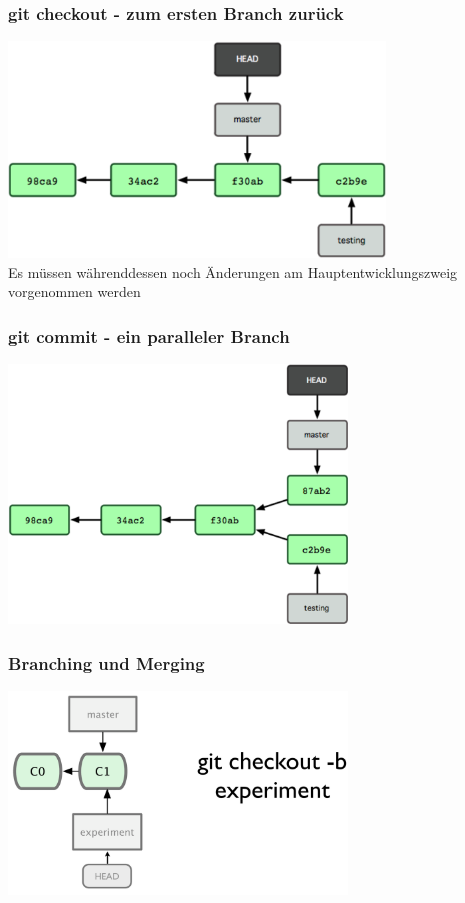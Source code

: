 \begin{frame}
  \frametitle{git checkout - zum ersten Branch zurück}
  \begin{center}
    \includegraphics[width=10cm]{img/checkout.png} \\
    Es müssen währenddessen noch Änderungen am Hauptentwicklungszweig vorgenommen werden
  \end{center}
\end{frame}

\begin{frame}
  \frametitle{git commit - ein paralleler Branch}
  \begin{center}
    \includegraphics[width=9cm]{img/branch.png}
  \end{center}
\end{frame}

\begin{frame}
  \frametitle{Branching und Merging}
  \begin{center}
    \includegraphics[width=9cm]{img/branch_1.pdf}
  \end{center}
\end{frame}

